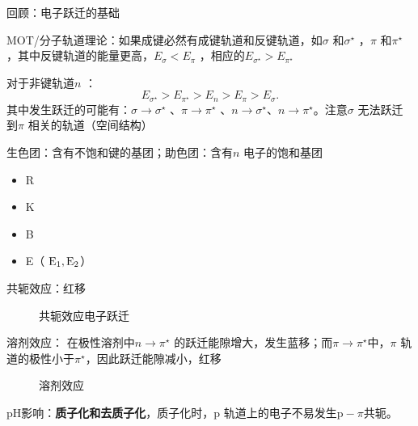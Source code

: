 回顾：电子跃迁的基础
\begin{notation}
    MOT/分子轨道理论：如果成键必然有成键轨道和反键轨道，如$\sigma$ 和$\sigma^\star $ ，$\pi $ 和$\pi ^\star $，其中反键轨道的能量更高，$E_{\sigma}<E_{\pi }$ ，相应的$E_{\sigma^\star }>E_{\pi ^\star }$
\end{notation}
对于非键轨道$n$ ：\[
    E_{\sigma^\star }>E_{\pi ^\star }>E_{n}>E_{\pi }>E_{\sigma}
.\]
其中发生跃迁的可能有：$\sigma\to \sigma^\star $ 、$\pi \to \pi ^\star $ 、$n\to \sigma^\star $、$n\to \pi ^\star $。注意$\sigma$ 无法跃迁到$\pi$ 相关的轨道（空间结构）

\begin{notation}
    生色团：含有不饱和键的基团；助色团：含有$n$ 电子的饱和基团
\end{notation}
\begin{itemize}
    \item R
    \item K
    \item B
    \item E（ $\ce{E_1,E_2}$）
\end{itemize}
共轭效应：红移
\begin{figure}[ht!]
    \centering
    \caption{共轭效应电子跃迁}
    \label{fig:共轭效应电子跃迁}
\end{figure}

溶剂效应：
在极性溶剂中$n\to \pi ^\star $ 的跃迁能隙增大，发生蓝移；而$\pi \to \pi ^\star $中，$\pi $ 轨道的极性小于$\pi ^\star $，因此跃迁能隙减小，红移
\begin{figure}[ht!]
    \centering
    \caption{溶剂效应}
    \label{fig:溶剂效应}
\end{figure}

pH影响：\textbf{质子化和去质子化}，质子化时，$\text{p} $ 轨道上的电子不易发生$\text{p} -\pi $共轭。

